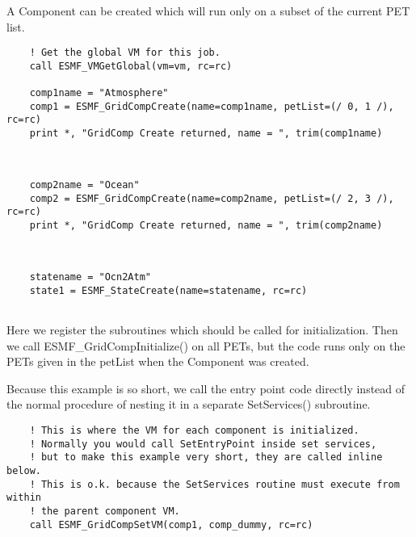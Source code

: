 
        
    A Component can be created which will run only on a subset of the
    current PET list. 

 \begin{verbatim}
    ! Get the global VM for this job.
    call ESMF_VMGetGlobal(vm=vm, rc=rc)

    comp1name = "Atmosphere"
    comp1 = ESMF_GridCompCreate(name=comp1name, petList=(/ 0, 1 /), rc=rc)
    print *, "GridComp Create returned, name = ", trim(comp1name)
 
\end{verbatim}
 

 \begin{verbatim}

    comp2name = "Ocean"
    comp2 = ESMF_GridCompCreate(name=comp2name, petList=(/ 2, 3 /), rc=rc)
    print *, "GridComp Create returned, name = ", trim(comp2name)
 
\end{verbatim}
 

 \begin{verbatim}

    statename = "Ocn2Atm"
    state1 = ESMF_StateCreate(name=statename, rc=rc)  
 
\end{verbatim}
 

     
    Here we register the subroutines which should be called for initialization.
    Then we call ESMF\_GridCompInitialize() on all PETs, but the code runs
    only on the PETs given in the petList when the Component was created.
  
    Because this example is so short, we call the entry point code
    directly instead of the normal procedure of nesting it in a separate
    SetServices() subroutine.  
   

 \begin{verbatim}
    ! This is where the VM for each component is initialized.
    ! Normally you would call SetEntryPoint inside set services,
    ! but to make this example very short, they are called inline below.
    ! This is o.k. because the SetServices routine must execute from within
    ! the parent component VM.
    call ESMF_GridCompSetVM(comp1, comp_dummy, rc=rc)
 
\end{verbatim}
 
